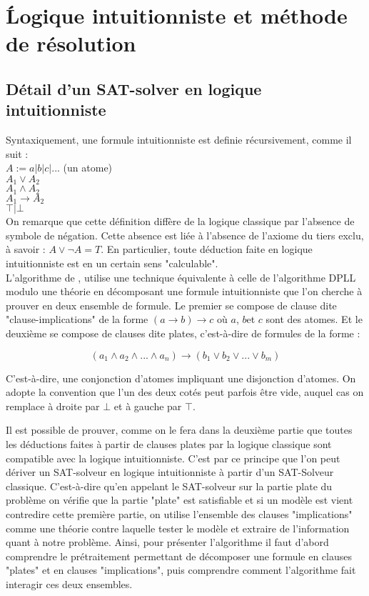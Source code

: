 \section{\'Logique intuitionniste et m\'ethode de r\'esolution}

\subsection{D\'etail d'un SAT-solver en logique intuitionniste}
Syntaxiquement, une formule intuitionniste est definie récursivement, comme il suit : \\

$A := a | b |c |... $ (un atome) \\
$A_1 \lor A_2 $ \\
$A_1 \land A_2 $ \\
$A_1 \to A_2 $ \\
$\top | \bot$ \\


On remarque que cette d\'efinition diff\`ere de la logique classique par l'absence de symbole de n\'egation. Cette absence est li\'ee \`a l'absence de l'axiome du tiers exclu, \`a savoir : $A \lor \neg A = T$. En particulier, toute d\'eduction faite en logique intuitionniste est en un certain sens "calculable".
\\
L'algorithme de \cite{intuit2015}, utilise une technique \'equivalente à celle de l'algorithme DPLL modulo une théorie en d\'ecomposant une formule intuitionniste que l'on cherche \`a prouver en deux ensemble de formule. Le premier se compose de clause dite "clause-implications" de la forme $(a \to b) \to c$ o\`u $a$, $b$et $c$ sont des atomes. Et le deuxi\`eme se compose de clauses dite plates, c'est-\`a-dire de formules de la forme :

$$(a_1 \land a_2 \land ... \land a_n) \to (b_1 \lor b_2 \lor ... \lor b_m) $$

C'est-\`a-dire, une conjonction d'atomes impliquant une disjonction d'atomes. On adopte la convention que l'un des deux cot\'es peut parfois \^etre vide, auquel cas on remplace \`a droite par $\bot$ et \`a gauche par $\top$. 


Il est possible de prouver, comme on le fera dans la deuxi\`eme partie que toutes les déductions faites \`a partir de clauses plates par la logique classique sont compatible avec la logique intuitionniste. C'est par ce principe que l'on peut d\'eriver un SAT-solveur en logique intuitionniste \`a partir d'un SAT-Solveur classique. C'est-\`a-dire qu'en appelant le SAT-solveur sur la partie plate du probl\`eme on v\'erifie que la partie "plate" est satisfiable et si un mod\`ele est vient contredire cette premi\`ere partie, on utilise l'ensemble des clauses "implications" comme une th\'eorie contre laquelle tester le mod\`ele et extraire de l'information quant \`a notre probl\`eme.
Ainsi, pour pr\'esenter l'algorithme il faut d'abord comprendre le pr\'etraitement permettant de d\'ecomposer une formule en clauses "plates" et en clauses "implications", puis comprendre comment l'algorithme fait interagir ces deux ensembles.



